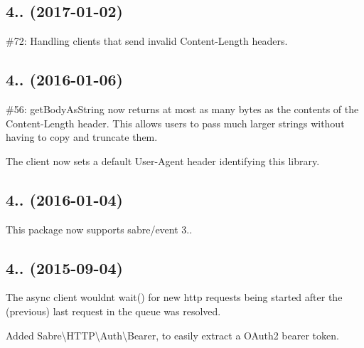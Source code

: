 \subsection*{4.. (2017-\/01-\/02) }


\begin{DoxyItemize}
\item \#72\+: Handling clients that send invalid {\ttfamily Content-\/\+Length} headers.
\end{DoxyItemize}

\subsection*{4.. (2016-\/01-\/06) }


\begin{DoxyItemize}
\item \#56\+: {\ttfamily get\+Body\+As\+String} now returns at most as many bytes as the contents of the {\ttfamily Content-\/\+Length} header. This allows users to pass much larger strings without having to copy and truncate them.
\item The client now sets a default {\ttfamily User-\/\+Agent} header identifying this library.
\end{DoxyItemize}

\subsection*{4.. (2016-\/01-\/04) }


\begin{DoxyItemize}
\item This package now supports sabre/event 3..
\end{DoxyItemize}

\subsection*{4.. (2015-\/09-\/04) }


\begin{DoxyItemize}
\item The async client wouldn\textquotesingle{}t {\ttfamily wait()} for new http requests being started after the (previous) last request in the queue was resolved.
\item Added {\ttfamily Sabre\textbackslash{}H\+T\+TP\textbackslash{}Auth\textbackslash{}Bearer}, to easily extract a O\+Auth2 bearer token.
\end{DoxyItemize}


